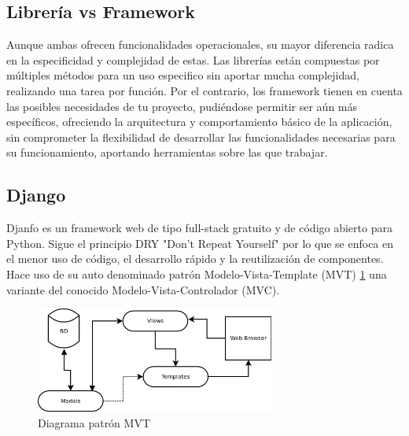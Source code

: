 \subsection{Librería vs Framework}
Aunque ambas ofrecen funcionalidades operacionales, su mayor diferencia radica en la especificidad y complejidad de estas. Las librerías están compuestas por múltiples métodos para un uso especifico sin aportar mucha complejidad, realizando una tarea por función.
\newline
\newline
Por el contrario, los framework tienen en cuenta las posibles necesidades de tu proyecto, pudiéndose permitir ser aún más específicos, ofreciendo la arquitectura y comportamiento básico de la aplicación, sin comprometer la flexibilidad de desarrollar las funcionalidades necesarias para su funcionamiento, aportando herramientas sobre las que trabajar. \cite{glez2014web}

\subsection{Django}
Djanfo es un framework web de tipo full-stack gratuito y de código abierto para Python. Sigue el principio DRY "Don’t Repeat Yourself" por lo que se enfoca en el menor uso de código, el desarrollo rápido y la reutilización de componentes. \cite{DjDF} \cite{alchin2013pro}
\newline
\newline
Hace uso de su auto denominado patrón Modelo-Vista-Template (MVT) \ref{fig:ej1} una variante del conocido Modelo-Vista-Controlador (MVC). \cite{ravindran2015django}

\begin{figure} [H]
	\centering
	\includegraphics[width=0.7\textwidth]{fig/DjangoMVT.png}
	\caption[Diagrama patrón MVT]{Diagrama patrón MVT \footnotemark}
	\label{fig:ej1}
\end{figure}

